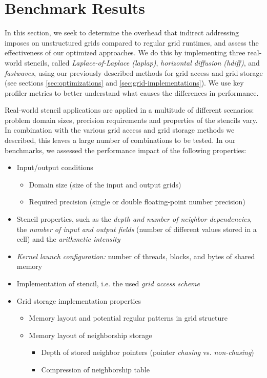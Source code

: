 \chapter{Benchmark Results}    \label{sec:results}

In this section, we seek to determine the overhead that indirect addressing imposes on unstructured grids compared to regular grid runtimes, and assess the effectiveness of our optimized approaches. We do this by implementing three real-world stencils, called \emph{Laplace-of-Laplace (laplap)}, \emph{horizontal diffusion (hdiff)}, and \emph{fastwaves}, using our previously described methods for grid access and grid storage (see sections \ref{sec:optimizations} and \ref{sec:grid-implementations}). We use key profiler metrics to better understand what causes the differences in performance.

Real-world stencil applications are applied in a multitude of different scenarios: problem domain sizes, precision requirements and properties of the stencils vary. In combination with the various grid access and grid storage methods we described, this leaves a large number of combinations to be tested. In our benchmarks, we assessed the performance impact of the following properties:

\begin{itemize}
    \item 
        Input/output conditions 
        \begin{itemize}
            \item Domain size (size of the input and output grids)
            \item Required precision (single or double floating-point number precision)
        \end{itemize}
    \item
        Stencil properties, such as the \emph{depth and number of neighbor dependencies}, the \emph{number of input and output fields} (number of different values stored in a cell) and the \emph{arithmetic intensity}
    \item
        \emph{Kernel launch configuration:} number of threads, blocks, and bytes of shared memory
	\item Implementation of stencil, i.e. the used \emph{grid access scheme}
    \item
        Grid storage implementation properties
        \begin{itemize}
            \item Memory layout and potential regular patterns in grid structure
            \item 
                Memory layout of neighborship storage
                \begin{itemize}
                    \item Depth of stored neighbor pointers (pointer \emph{chasing} vs. \emph{non-chasing})
                    \item Compression of neighborship table
                \end{itemize}
        \end{itemize}

\end{itemize}

